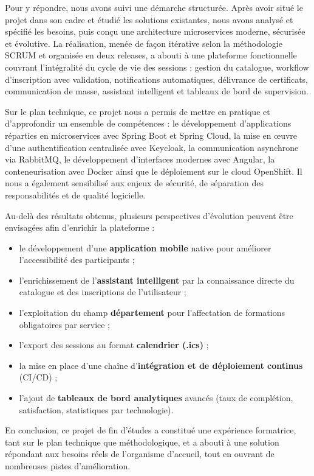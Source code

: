 \documentclass[12pt,a4paper,oneside]{report}
\begin{document}
Pour y répondre, nous avons suivi une démarche structurée. Après avoir situé le projet dans son
cadre et étudié les solutions existantes, nous avons analysé et spécifié les besoins, puis
conçu une architecture microservices moderne, sécurisée et évolutive. La réalisation, menée de
façon itérative selon la méthodologie SCRUM et organisée en deux releases, a abouti à une
plateforme fonctionnelle couvrant l'intégralité du cycle de vie des sessions : gestion du
catalogue, workflow d'inscription avec validation, notifications automatiques, délivrance de
certificats, communication de masse, assistant intelligent et tableaux de bord de supervision.

Sur le plan technique, ce projet nous a permis de mettre en pratique et d'approfondir un
ensemble de compétences : le développement d'applications réparties en microservices avec
Spring Boot et Spring Cloud, la mise en œuvre d'une authentification centralisée avec Keycloak,
la communication asynchrone via RabbitMQ, le développement d'interfaces modernes avec Angular,
la conteneurisation avec Docker ainsi que le déploiement sur le cloud OpenShift. Il nous a
également sensibilisé aux enjeux de
sécurité, de séparation des responsabilités et de qualité logicielle.

Au-delà des résultats obtenus, plusieurs perspectives d'évolution peuvent être envisagées afin
d'enrichir la plateforme :

\begin{itemize}[leftmargin=1.2cm]
  \item le développement d'une \textbf{application mobile} native pour améliorer
  l'accessibilité des participants ;
  \item l'enrichissement de l'\textbf{assistant intelligent} par la connaissance directe du
  catalogue et des inscriptions de l'utilisateur ;
  \item l'exploitation du champ \textbf{département} pour l'affectation de formations
  obligatoires par service ;
  \item l'export des sessions au format \textbf{calendrier (.ics)} ;
  \item la mise en place d'une chaîne d'\textbf{intégration et de déploiement continus}
  (CI/CD) ;
  \item l'ajout de \textbf{tableaux de bord analytiques} avancés (taux de complétion,
  satisfaction, statistiques par technologie).
\end{itemize}

En conclusion, ce projet de fin d'études a constitué une expérience formatrice, tant sur le
plan technique que méthodologique, et a abouti à une solution répondant aux besoins réels de
l'organisme d'accueil, tout en ouvrant de nombreuses pistes d'amélioration.
\clearpage
\end{document}
